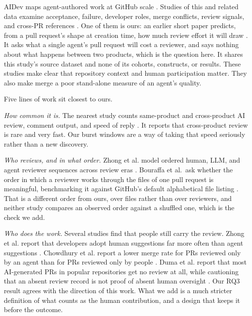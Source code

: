 \documentclass[lineno,pdflatex,sn-basic]{sn-jnl}
\begin{document}
AIDev maps agent-authored work at GitHub scale \citep{li2026aidev}. Studies of
this and related data examine acceptance, failure, developer roles, merge
conflicts, review signals, and cross-PR references
\citep{pinna2026comparing,ehsani2026fail,cynthia2026roles,xu2026conflict,
nachuma2026review,khemissi2026references}. One of them is ours: an earlier short
paper predicts, from a pull request's shape at creation time, how much review
effort it will draw \citep{daosy2026revieweffort}. It asks what a single
agent's pull request will cost a reviewer, and says nothing about what happens
between two products, which is the question here. It shares this study's source
dataset and none of its cohorts, constructs, or results. These studies make clear that
repository context and human participation matter. They also make merge a poor
stand-alone measure of an agent's quality.

Five lines of work sit closest to ours.

\emph{How common it is.} The nearest study counts same-product and
cross-product AI review, comment output, and speed of reply
\citep{selvanayagam2026a2a}. It reports that cross-product review is rare and
very fast. Our burst windows are a way of taking that speed seriously rather
than a new discovery.

\emph{Who reviews, and in what order.} Zhong et al. model ordered human, LLM,
and agent reviewer sequences across review eras \citep{zhong2026agenticreview}.
Bouraffa et al.\ ask whether the order in which a reviewer works through the
files of one pull request is meaningful, benchmarking it against GitHub's
default alphabetical file listing \citep{bouraffa2025orders}. That is a
different order from ours, over files rather than over reviewers, and neither
study compares an observed order against a shuffled one, which is the check we
add.

\emph{Who does the work.} Several studies find that people still carry the
review. Zhong et al. report that developers adopt human suggestions far more
often than agent suggestions \citep{zhong2026synergy}. Chowdhury et al. report a
lower merge rate for PRs reviewed only by an agent than for PRs reviewed only by
people \citep{chowdhury2026industry}. Duma et al. report that most AI-generated PRs in popular repositories get no
review at all, while cautioning that an absent review record is not proof of
absent human oversight \citep{duma2026reviews}. Our RQ3 result agrees with the
direction of this work. What we add is a much stricter definition of what counts
as the human contribution, and a design that keeps it before the outcome.
\end{document}
